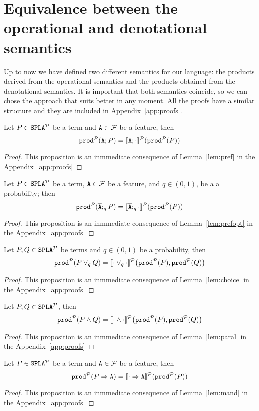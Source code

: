 \section{Equivalence between the operational and denotational semantics}\label{sec:equivalence}
Up to now we have defined two different semantics for our language:
the products derived from the operational semantics and the products
obtained from the denotational semantics. It is important that
both semantics coincide, so we can chose the approach that suits
better in any moment. All the proofs have a similar structure and they
are included in Appendix~\ref{app:proofs}. 

\bprop\label{prop:pref}
  Let $P\in\fodaPAp$ be a term and $\feature{A}\in\calF$ be a feature, then
  $$\prodp(\feature{A};P)=\semdenp{\feature{A};\cdot}(\prodp(P))$$
\begin{proof}
  This proposition is an inmmediate consequence of
  Lemma~\ref{lem:pref} in the Appendix~\ref{app:proofs}
\end{proof}
\eprop

\bprop\label{prop:prefopt}
  Let  $P\in\fodaPAp$ be a term, $\feature{A}\in\calF$ be a
  feature, and $q\in (0,1)$, be a a probability; then
  $$\prodp(\ofeature{A};_qP)=\semdenp{\ofeature{A};_q\cdot}(\prodp(P))$$
\begin{proof}
  This proposition is an inmmediate consequence of
  Lemma~\ref{lem:prefopt} in the Appendix~\ref{app:proofs}
\end{proof}
\eprop


\bprop\label{prop:choice}
  Let $P,Q\in\fodaPAp$ be terms and $q\in (0,1)$ be a probability, then
  $$\prodp(P\choice_q Q)=\semdenp{\cdot\choice_q\cdot}\bigl(\prodp(P),\prodp(Q)\bigr)$$
\begin{proof}
  This proposition is an inmmediate consequence of
  Lemma~\ref{lem:choice} in the Appendix~\ref{app:proofs}
\end{proof}
\eprop


\bprop\label{prop:paral}
  Let $P,Q\in\fodaPAp$, then
  $$\prodp(P\paral Q)=\semdenp{\cdot\paral\cdot}\bigl(\prodp(P),\prodp(Q)\bigr)$$
\begin{proof}
  This proposition is an inmmediate consequence of
  Lemma~\ref{lem:paral} in the Appendix~\ref{app:proofs}
\end{proof}
\eprop

\bprop\label{prop:mand}
  Let $P\in\fodaPAp$  be a term and $\feature{A}\in\calF$ be a feature, then
  $$\prodp(\mandatory{A}{P})=\semdenp{\mandatory{A}{\cdot}}(\prodp(P))$$
\begin{proof}
  This proposition is an inmmediate consequence of
  Lemma~\ref{lem:mand} in the Appendix~\ref{app:proofs}
\end{proof}
\eprop

